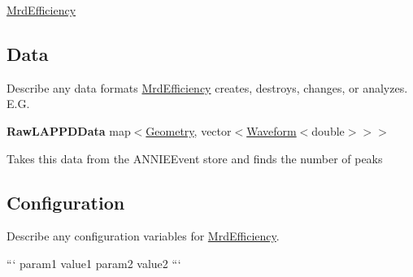 \hyperlink{classMrdEfficiency}{Mrd\-Efficiency}

\subsection*{Data}

Describe any data formats \hyperlink{classMrdEfficiency}{Mrd\-Efficiency} creates, destroys, changes, or analyzes. E.\-G.

{\bfseries Raw\-L\-A\-P\-P\-D\-Data} {\ttfamily map$<$\hyperlink{classGeometry}{Geometry}, vector$<$\hyperlink{classWaveform}{Waveform}$<$double$>$$>$$>$}
\begin{DoxyItemize}
\item Takes this data from the {\ttfamily A\-N\-N\-I\-E\-Event} store and finds the number of peaks
\end{DoxyItemize}

\subsection*{Configuration}

Describe any configuration variables for \hyperlink{classMrdEfficiency}{Mrd\-Efficiency}.

``` param1 value1 param2 value2 ``` 